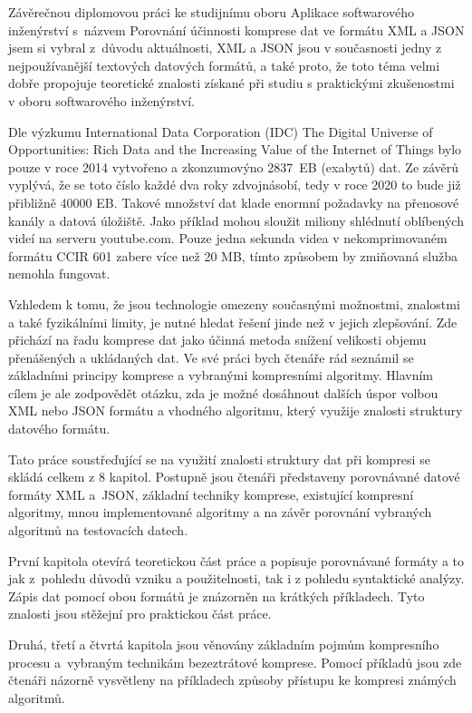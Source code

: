 Závěrečnou diplomovou práci ke studijnímu oboru Aplikace softwarového inženýrství s~ná\-zvem Porovnání účinnosti komprese dat ve formátu XML a JSON jsem si vybral z~důvodu aktuálnosti, XML a JSON jsou v současnosti jedny z nejpoužívanější textových datových formátů, a také proto, že toto téma velmi dobře propojuje teoretické znalosti získané při studiu s praktickými zkušenostmi v oboru softwarového inženýrství.

Dle výzkumu International Data Corporation (IDC) The Digital Universe of Opportunities: Rich Data and the Increasing Value of the Internet of Things \cite{idc} bylo pouze v roce 2014 vytvořeno a zkonzumovýno 2837~EB (exabytů) dat. Ze závěrů vyplývá, že se toto číslo každé dva roky zdvojnásobí, tedy v roce 2020 to bude již přibližně 40000 EB. Takové množství dat klade enormní požadavky na přenosové kanály a datová úložiště. Jako příklad mohou sloužit miliony shlédnutí oblíbených videí na serveru youtube.com. Pouze jedna sekunda videa v nekomprimovaném formátu CCIR 601 zabere více než 20 MB, tímto způsobem by zmiňovaná služba nemohla fungovat.

Vzhledem k tomu, že jsou technologie omezeny současnými možnostmi, znalostmi a také fyzikálními limity, je nutné hledat řešení jinde než v jejich zlepšování. Zde přichází na řadu komprese dat jako účinná metoda snížení velikosti objemu přenášených a ukládaných dat. Ve své práci bych čtenáře rád seznámil se základními principy komprese a vybranými kompresními algoritmy. Hlavním cílem je ale zodpovědět otázku, zda je možné dosáhnout dalších úspor volbou XML nebo JSON formátu a vhodného algoritmu, který využije znalosti struktury datového formátu.

Tato práce soustřeďující se na využití znalosti struktury dat při kompresi se skládá celkem z 8 kapitol. Postupně jsou čtenáři představeny porovnávané datové formáty XML a~JSON, základní techniky komprese, existující kompresní algoritmy, mnou implementované algoritmy a na závěr porovnání vybraných algoritmů na testovacích datech.

První kapitola otevírá teoretickou část práce a popisuje porovnávané formáty a to jak z~pohledu důvodů vzniku a použitelnosti, tak i z pohledu syntaktické analýzy. Zápis dat pomocí obou formátů je znázorněn na krátkých příkladech. Tyto znalosti jsou stěžejní pro praktickou část práce.

Druhá, třetí a čtvrtá kapitola jsou věnovány základním pojmům kompresního procesu a~vybraným technikám bezeztrátové komprese. Pomocí příkladů jsou zde čtenáři názorně vysvětleny na příkladech způsoby přístupu ke kompresi známých algoritmů.


